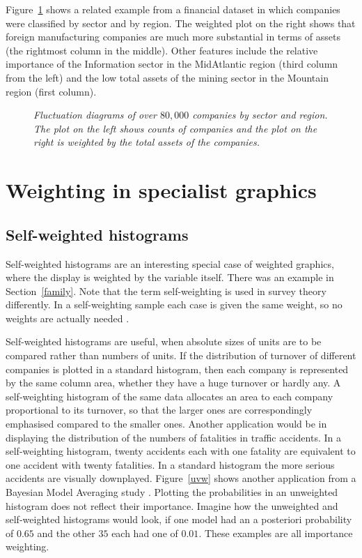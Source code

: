 \documentclass{svmult}
\begin{document}
Figure~\ref{indreg} shows a related example from a financial dataset in which companies were classified by sector and by region.  The weighted plot on the right shows that foreign manufacturing companies are much more substantial in terms of assets (the rightmost column in the middle).  Other features include the relative importance of the Information sector in the MidAtlantic region (third column from the left) and the low total assets of the mining sector in the Mountain region (first column).

\begin{figure}[htbp]
  \centering
  \caption{\label{indreg}\em Fluctuation diagrams of over $80,000$ companies by sector and region.  The plot on the left shows counts of companies and the plot on the right is weighted by the total assets of the companies.}
\end{figure}

\section{Weighting in specialist graphics}
\label{spec}

\subsection{Self-weighted histograms}
\label{shist}
Self-weighted histograms are an interesting special case of weighted graphics, where the display is weighted by the variable itself.  There was an example in Section~\ref{family}.  Note that the term self-weighting is used in survey theory differently.  In a self-weighting sample each case is given the same weight, so no weights are actually needed \citep{cochran:1954a}.

Self-weighted histograms are useful, when absolute sizes of units are to be compared rather than numbers of units.  If the distribution of turnover of different companies is plotted in a standard histogram, then each company is represented by the same column area, whether they have a huge turnover or hardly any.  A self-weighting histogram of the same data allocates an area to each company proportional to its turnover, so that the larger ones are correspondingly emphasised compared to the smaller ones.  Another application would be in displaying the distribution of the numbers of fatalities in traffic accidents.  In a self-weighting histogram, twenty accidents each with one fatality are equivalent to one accident with twenty fatalities.  In a standard histogram the more serious accidents are visually downplayed.  Figure~\ref{uvw} shows another application from a Bayesian Model Averaging study \citep{unwin:2003}.  Plotting the probabilities in an unweighted histogram does not reflect their importance.  Imagine how the unweighted and self-weighted histograms would look, if one model had an a posteriori probability of $0.65$ and the other $35$ each had one of $0.01$.  These examples are all importance weighting.
\end{document}

